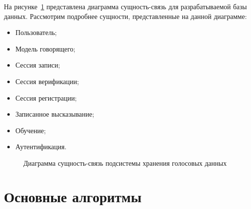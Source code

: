 На рисунке~\ref{fig:er_main} представлена диаграмма сущность-связь для разрабатываемой базы данных. Рассмотрим подробнее сущности, представленные на данной диаграмме:

\begin{itemize}
\item Пользователь;
\item Модель говорящего;
\item Сессия записи;
\item Сессия верификации;
\item Сессия регистрации;
\item Записанное высказывание;
\item Обучение;
\item Аутентификация.
\end{itemize}

\begin{figure}
    
    \caption{Диаграмма сущность-связь подсистемы хранения голосовых данных}
    \label{fig:er_main}
\end{figure}


\section{Основные алгоритмы}

